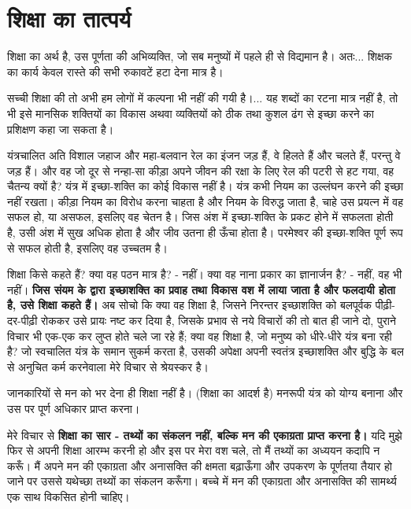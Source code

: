 \section*{शिक्षा का तात्पर्य}

\vskip -5pt

शिक्षा का अर्थ है, उस पूर्णता की अभिव्यक्ति, जो सब मनुष्यों में पहले ही से विद्यमान है। अतः... शिक्षक का कार्य केवल रास्ते की सभी रुकावटें हटा देना मात्र है। 

सच्ची शिक्षा की तो अभी हम लोगों में कल्पना भी नहीं की गयी है।... यह शब्दों का रटना मात्र नहीं है, तो भी इसे मानसिक शक्तियों का विकास अथवा व्यक्तियों को ठीक तथा कुशल ढंग से इच्छा करने का प्रशिक्षण कहा जा सकता है। 

यंत्रचालित अति विशाल जहाज और महा-बलवान रेल का इंजन जड़ हैं, वे हिलते हैं और चलते हैं, परन्तु वे जड़ हैं। और वह जो दूर से नन्हा-सा कीड़ा अपने जीवन की रक्षा के लिए रेल की पटरी से हट गया, वह चैतन्य क्यों है? यंत्र में इच्छा-शक्ति का कोई विकास नहीं है। यंत्र कभी नियम का उल्लंघन करने की इच्छा नहीं रखता। कीड़ा नियम का विरोध करना चाहता है और नियम के विरुद्ध जाता है, चाहे उस प्रयत्न में वह सफल हो, या असफल, इसलिए वह चेतन है। जिस अंश में इच्छा-शक्ति के प्रकट होने में सफलता होती है, उसी अंश में सुख अधिक होता है और जीव उतना ही ऊँचा होता है। परमेश्वर की इच्छा-शक्ति पूर्ण रूप से सफल होती है, इसलिए वह उच्चतम है। 

शिक्षा किसे कहते हैं? क्या वह पठन मात्र है? - नहीं। क्या वह नाना प्रकार का ज्ञानार्जन है? - नहीं, वह भी नहीं। \textbf{जिस संयम के द्वारा इच्छाशक्ति का प्रवाह तथा विकास वश में लाया जाता है और फलदायी होता है, उसे शिक्षा कहते हैं। } अब सोचो कि क्या वह शिक्षा है, जिसने निरन्तर इच्छाशक्ति को बलपूर्वक पीढ़ी-दर-पीढ़ी रोककर उसे प्रायः नष्ट कर दिया है, जिसके प्रभाव से नये विचारों की तो बात ही जाने दो, पुराने विचार भी एक-एक कर लुप्त होते चले जा रहे हैं; क्या वह शिक्षा है, जो मनुष्य को धीरे-धीरे यंत्र बना रही है? जो स्वचालित यंत्र के समान सुकर्म करता है, उसकी अपेक्षा अपनी स्वतंत्र इच्छाशक्ति और बुद्धि के बल से अनुचित कर्म करनेवाला मेरे विचार से श्रेयस्कर है। 

जानकारियों से मन को भर देना ही शिक्षा नहीं है। (शिक्षा का आदर्श है) मनरूपी यंत्र को योग्य बनाना और उस पर पूर्ण अधिकार प्राप्त करना। 

मेरे विचार से \textbf{शिक्षा का सार - तथ्यों का संकलन नहीं, बल्कि मन की एकाग्रता प्राप्त करना है। } यदि मुझे फिर से अपनी शिक्षा आरम्भ करनी हो और इस पर मेरा वश चले, तो मैं तथ्यों का अध्ययन कदापि न करूँ। मैं अपने मन की एकाग्रता और अनासक्ति की क्षमता बढ़ाऊँगा और उपकरण के पूर्णतया तैयार हो जाने पर उससे यथेच्छा तथ्यों का संकलन करूँगा। बच्चे में मन की एकाग्रता और अनासक्ति की सामर्थ्य एक साथ विकसित होनी चाहिए। 

